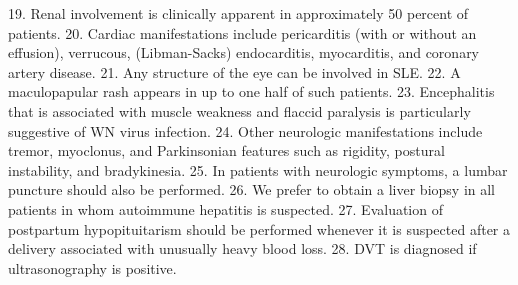 19. Renal involvement is clinically apparent in approximately 50 percent of patients.
20. Cardiac manifestations include pericarditis (with or without an effusion), verrucous, (Libman-Sacks) endocarditis, myocarditis, and coronary artery disease.
21. Any structure of the eye can be involved in SLE.
22. A maculopapular rash appears in up to one half of such patients.
23. Encephalitis that is associated with muscle weakness and flaccid paralysis is particularly suggestive of WN virus infection.
24. Other neurologic manifestations include tremor, myoclonus, and Parkinsonian features such as rigidity, postural instability, and bradykinesia.
25. In patients with neurologic symptoms, a lumbar puncture should also be performed.
26. We prefer to obtain a liver biopsy in all patients in whom autoimmune hepatitis is suspected.
27. Evaluation of postpartum hypopituitarism should be performed whenever it is suspected after a delivery associated with unusually heavy blood loss.
28. DVT is diagnosed if ultrasonography is positive.

